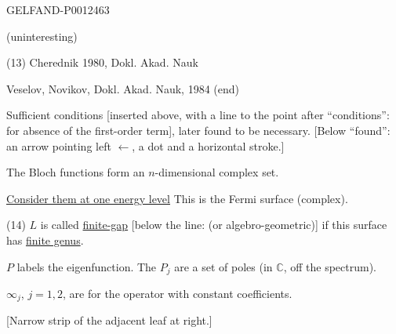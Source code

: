 \begin{GelfandAdjacentEvidence}{GELFAND-P001246}{3}


(uninteresting)

(13) Cherednik 1980, Dokl. Akad. Nauk

Veselov, Novikov, Dokl. Akad. Nauk, 1984 (end)

Sufficient conditions [inserted above, with a line to the point after “conditions”: for absence of the first-order term], later found to be necessary.
[Below “found”: an arrow pointing left $\longleftarrow$, a dot and a horizontal stroke.]

The Bloch functions form an $n$-dimensional complex set.

\underline{Consider them at one energy level} This is the Fermi surface (complex).

(14) $L$ is called \underline{finite-gap} [below the line: (or algebro-geometric)] if this surface has \underline{finite genus}.

$P$ labels the eigenfunction. The $P_j$ are a set of poles (in $\mathbb C$, off the spectrum).

$\infty_j$, $j=1,2$, are for the operator with constant coefficients.

[Narrow strip of the adjacent leaf at right.]
\end{GelfandAdjacentEvidence}



